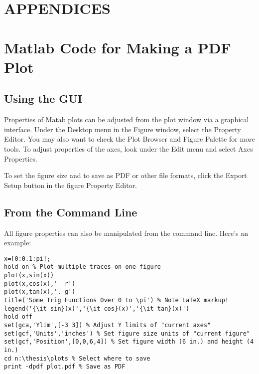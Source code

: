 \documentclass[letterpaper,12pt,titlepage,oneside,final]{book}
\theoremstyle{plain}
\theoremstyle{definition}
\begin{document}




\appendix
\chapter*{APPENDICES}
\chapter[PDF Plots From Matlab]{Matlab Code for Making a PDF Plot}
\label{AppendixA}
\section{Using the GUI}
Properties of Matab plots can be adjusted from the plot window via a graphical interface. Under the Desktop menu in the Figure window, select the Property Editor. You may also want to check the Plot Browser and Figure Palette for more tools. To adjust properties of the axes, look under the Edit menu and select Axes Properties.

To set the figure size and to save as PDF or other file formats, click the Export Setup button in the figure Property Editor.

\section{From the Command Line} 
All figure properties can also be manipulated from the command line. Here's an example: 
\begin{verbatim}
x=[0:0.1:pi];
hold on % Plot multiple traces on one figure
plot(x,sin(x))
plot(x,cos(x),'--r')
plot(x,tan(x),'.-g')
title('Some Trig Functions Over 0 to \pi') % Note LaTeX markup!
legend('{\it sin}(x)','{\it cos}(x)','{\it tan}(x)')
hold off
set(gca,'Ylim',[-3 3]) % Adjust Y limits of "current axes"
set(gcf,'Units','inches') % Set figure size units of "current figure"
set(gcf,'Position',[0,0,6,4]) % Set figure width (6 in.) and height (4 in.)
cd n:\thesis\plots % Select where to save
print -dpdf plot.pdf % Save as PDF
\end{verbatim}
\end{document}
